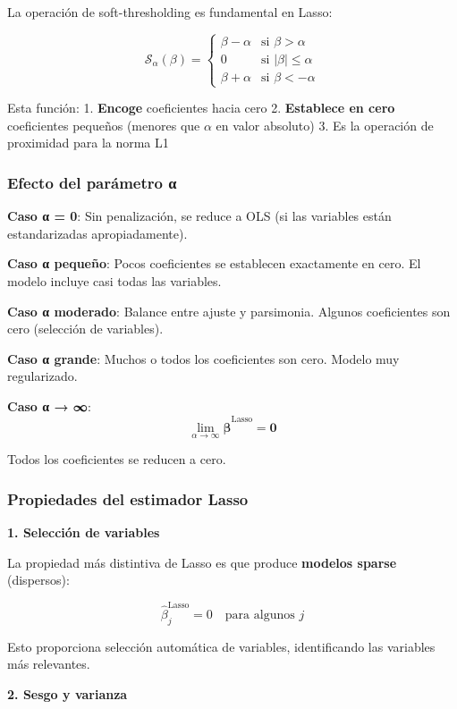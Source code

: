 \documentclass[
  doc,
  floatsintext,
  longtable,
  a4paper,
  nolmodern,
  notxfonts,
  notimes,
  12pt,
  colorlinks=true,linkcolor=blue,citecolor=blue,urlcolor=blue]{apa7}
\begin{document}
La operación de soft-thresholding es fundamental en Lasso:

\[
\mathcal{S}_{\alpha}(\beta) = \begin{cases}
\beta - \alpha & \text{si } \beta > \alpha \\
0 & \text{si } |\beta| \leq \alpha \\
\beta + \alpha & \text{si } \beta < -\alpha
\end{cases}
\]

Esta función: 1. \textbf{Encoge} coeficientes hacia cero 2.
\textbf{Establece en cero} coeficientes pequeños (menores que \(\alpha\)
en valor absoluto) 3. Es la operación de proximidad para la norma L1

\subsubsection{Efecto del parámetro
α}\label{efecto-del-paruxe1metro-ux3b1}

\textbf{Caso α = 0}: Sin penalización, se reduce a OLS (si las variables
están estandarizadas apropiadamente).

\textbf{Caso α pequeño}: Pocos coeficientes se establecen exactamente en
cero. El modelo incluye casi todas las variables.

\textbf{Caso α moderado}: Balance entre ajuste y parsimonia. Algunos
coeficientes son cero (selección de variables).

\textbf{Caso α grande}: Muchos o todos los coeficientes son cero. Modelo
muy regularizado.

\textbf{Caso α → ∞}: \[
\lim_{\alpha \to \infty} \hat{\boldsymbol{\beta}}^{\text{Lasso}} = \mathbf{0}
\]

Todos los coeficientes se reducen a cero.

\subsubsection{Propiedades del estimador
Lasso}\label{propiedades-del-estimador-lasso}

\textbf{1. Selección de variables}

La propiedad más distintiva de Lasso es que produce \textbf{modelos
sparse} (dispersos):

\[
\hat{\beta}_j^{\text{Lasso}} = 0 \quad \text{para algunos } j
\]

Esto proporciona selección automática de variables, identificando las
variables más relevantes.

\textbf{2. Sesgo y varianza}
\end{document}
